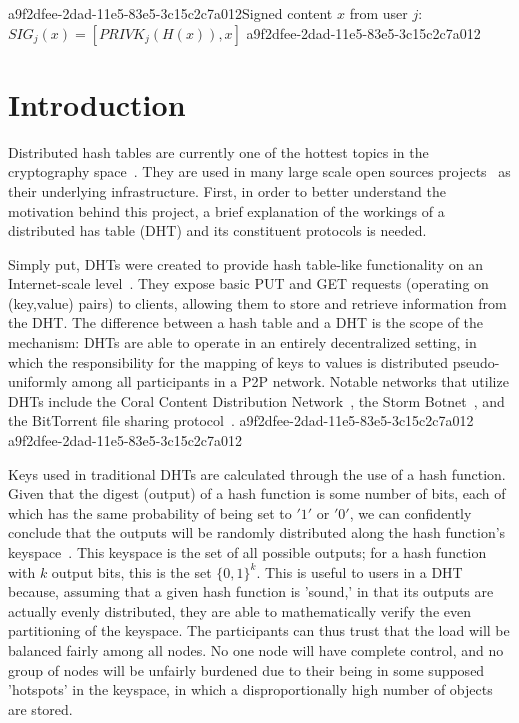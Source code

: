 \documentclass[12pt]{article}
\begin{document}
a9f2dfee-2dad-11e5-83e5-3c15c2c7a012Signed content $x$ from user $j$: $SIG_j(x) = \left[ PRIVK_j( H(x) ), x \right]$
a9f2dfee-2dad-11e5-83e5-3c15c2c7a012
\section{Introduction}
\par Distributed hash tables are currently one of the hottest topics in the cryptography space~\cite{Stoica:2001dj,Rowstron:2001ea,Ratnasamy:2001wn}. They are used in many large scale open sources projects~\cite{Freitas:2013tb,Xu:2010vs,Perfitt:2010fh} as their underlying infrastructure. First, in order to better understand the motivation behind this project, a brief explanation of the workings of a distributed has table (DHT) and its constituent protocols is needed.

\par Simply put, DHTs were created to provide hash table-like functionality on an Internet-scale level~\cite{Ratnasamy:2001wn}. They expose basic PUT and GET requests (operating on (key,value) pairs) to clients, allowing them to store and retrieve information from the DHT. The difference between a hash table and a DHT is the scope of the mechanism: DHTs are able to operate in an entirely decentralized setting, in which the responsibility for the mapping of keys to values is distributed pseudo-uniformly among all participants in a P2P network. Notable networks that utilize DHTs include the Coral Content Distribution Network~\cite{Freedman:2004vb}, the Storm Botnet~\cite{Holz:2008uk}, and the BitTorrent file sharing protocol~\cite{Cohen:y1_8mBnw}.
a9f2dfee-2dad-11e5-83e5-3c15c2c7a012
a9f2dfee-2dad-11e5-83e5-3c15c2c7a012\par Keys used in traditional DHTs are calculated through the use of a hash function. Given that the digest (output) of a hash function is some number of bits, each of which has the same probability of being set to $'1'$ or $'0'$, we can confidently conclude that the outputs will be randomly distributed along the hash function's keyspace~. This keyspace is the set of all possible outputs; for a hash function with $k$ output bits, this is the set $\{0,1\}^k$. This is useful to users in a DHT because, assuming that a given hash function is 'sound,' in that its outputs are actually evenly distributed, they are able to mathematically verify the even partitioning of the keyspace. The participants can thus trust that the load will be balanced fairly among all nodes. No one node will have complete control, and no group of nodes will be unfairly burdened due to their being in some supposed 'hotspots' in the keyspace, in which a disproportionally high number of objects are stored.~
\end{document}
